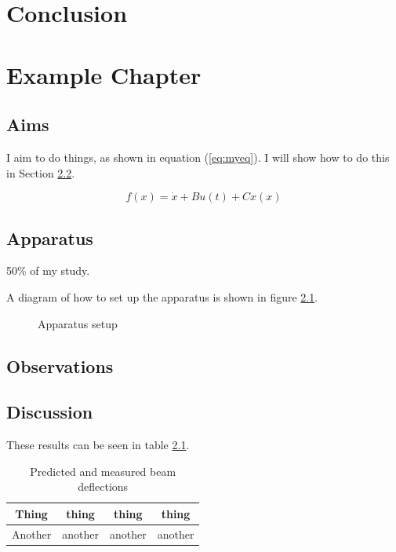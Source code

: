 \documentclass[a4paper]{report}
\begin{document}
\chapter{Conclusion}




\chapter{Example Chapter}

  \section{Aims}
  I aim to do things, as shown in equation (\ref{eq:myeq}). I will show how to do this in Section \ref{app}.

  \begin{equation}
  \label{eq:myeq}
  f(x) = \dot{x} + B u(t) + C x(x)
  \end{equation}


  \section{Apparatus}
  \label{app}

  	50\% of my study.

      A diagram of how to set up the apparatus is shown in figure \ref{fig:app}.

      \begin{figure}
      \centering
      \caption{Apparatus setup}
      \label{fig:app}
      \end{figure}

  \section{Observations}


  \section{Discussion}

      These results can be seen in table \ref{fig:myt}.

      \begin{table}
      \begin{center}
      \caption{Predicted and measured beam deflections}
      \begin{tabular}{|c|c|c|c|}
  	\hline
  	Thing & thing & thing & thing \\
  	\hline
  	Another & another & another & another \\
  	\hline
      \end{tabular}
      \end{center}
      \label{fig:myt}
      \end{table}
\end{document}
